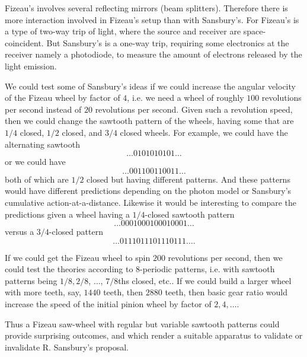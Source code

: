 \documentclass[12pt]{amsart}
\begin{document}
Fizeau's involves several reflecting mirrors (beam splitters). Therefore there is more interaction involved in Fizeau's setup than with Sansbury's. For Fizeau's is a type of two-way trip of light, where the source and receiver are space-coincident. But Sansbury's is a one-way trip, requiring some electronics at the receiver namely a photodiode, to measure the amount of electrons released by the light emission.

We could test some of Sansbury's ideas if we could increase the angular velocity of the Fizeau wheel by factor of $4$, i.e. we need a wheel of roughly $100$ revolutions per second instead of $20$ revolutions per second. Given such a revolution speed, then we could change the sawtooth pattern of the wheels, having some that are $1/4$ closed, $1/2$ closed, and $3/4$ closed wheels. For example, we could have the alternating sawtooth $$\ldots 0101010101 \ldots$$ or we could have $$\ldots 001100110011 \ldots$$ both of which are $1/2$ closed but having different patterns. And these patterns would have different predictions depending on the photon model or Sansbury's cumulative action-at-a-distance. Likewise it would be interesting to compare the predictions given a wheel having a $1/4$-closed sawtooth pattern $$\ldots 0001000100010001 \ldots$$ versus a $3/4$-closed pattern $$ \ldots 0111011101110111\ldots.$$ 

If we could get the Fizeau wheel to spin $200$ revolutions per second, then we could test the theories according to $8$-periodic patterns, i.e. with sawtooth patterns being $1/8, 2/8$, $\ldots$, $7/8$ths closed, etc.. If we could build a larger wheel with more teeth, say, $1440$ teeth, then $2880$ teeth, then basic gear ratio would increase the speed of the initial pinion wheel by factor of $2,4, \ldots$.

Thus a Fizeau saw-wheel with regular but variable sawtooth patterns could provide surprising outcomes, and which render a suitable apparatus to validate or invalidate R. Sansbury's proposal.

\end{document}
